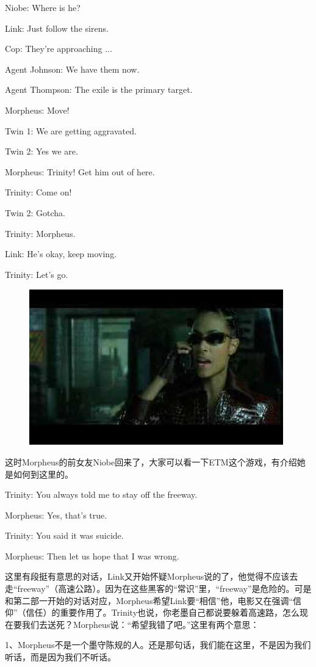 \documentclass[UTF8]{ctexart}
\newenvironment{myquote}{\color{green} \setlength{\leftskip}{6em} \setlength{\rightskip}{4em} \setlength{\parindent}{-2em}}{\par}
\begin{document}
\begin{myquote}
Niobe: Where is he?

Link: Just follow the sirens.

Cop: They're approaching ...

Agent Johnson: We have them now.

Agent Thompson: The exile is the primary target.

Morpheus: Move!

Twin 1: We are getting aggravated.

Twin 2: Yes we are.

Morpheus: Trinity! Get him out of here.

Trinity: Come on!

Twin 2: Gotcha.

Trinity: Morpheus.

Link: He's okay, keep moving.

Trinity: Let's go.
\end{myquote}

\begin{figure}[htb]
\centering
\includegraphics[width=0.5\linewidth]{fig/read_reloaded-130}
\end{figure}

这时Morpheus的前女友Niobe回来了，大家可以看一下ETM这个游戏，有介绍她是如何到这里的。

Trinity: You always told me to stay off the freeway.

Morpheus: Yes, that's true.

Trinity: You said it was suicide.

Morpheus: Then let us hope that I was wrong.

这里有段挺有意思的对话，Link又开始怀疑Morpheus说的了，他觉得不应该去走“freeway”（高速公路）。因为在这些黑客的“常识”里，“freeway”是危险的。可是和第二部一开始的对话对应，Morpheus希望Link要“相信”他，电影又在强调“信仰”（信任）的重要作用了。Trinity也说，你老墨自己都说要躲着高速路，怎么现在要我们去送死？Morpheus说：“希望我错了吧。”这里有两个意思：

1、Morpheus不是一个墨守陈规的人。还是那句话，我们能在这里，不是因为我们听话，而是因为我们不听话。
\end{document}
